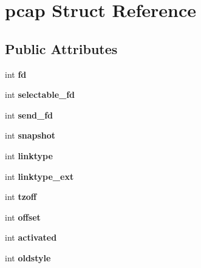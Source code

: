 \hypertarget{structpcap}{
\section{pcap Struct Reference}
\label{structpcap}
}
\subsection*{Public Attributes}
\begin{DoxyCompactItemize}
\item 
\hypertarget{structpcap_af62fe86226b8ac4e32781d40dde1750c}{
int {\bfseries fd}}
\label{structpcap_af62fe86226b8ac4e32781d40dde1750c}

\item 
\hypertarget{structpcap_af1b98dab6bcdf1d6433d32a874aee01a}{
int {\bfseries selectable\_\-fd}}
\label{structpcap_af1b98dab6bcdf1d6433d32a874aee01a}

\item 
\hypertarget{structpcap_aae63fa5b8783665a389a20d225146389}{
int {\bfseries send\_\-fd}}
\label{structpcap_aae63fa5b8783665a389a20d225146389}

\item 
\hypertarget{structpcap_a926f08ed91161e6300a1bf8319204059}{
int {\bfseries snapshot}}
\label{structpcap_a926f08ed91161e6300a1bf8319204059}

\item 
\hypertarget{structpcap_aec70b339b99cd421a34ad4f11091a8eb}{
int {\bfseries linktype}}
\label{structpcap_aec70b339b99cd421a34ad4f11091a8eb}

\item 
\hypertarget{structpcap_a66fb2efa5e37ef0d34040cdedb994ce4}{
int {\bfseries linktype\_\-ext}}
\label{structpcap_a66fb2efa5e37ef0d34040cdedb994ce4}

\item 
\hypertarget{structpcap_aa02a3bc13188acfa19e0637b29937df5}{
int {\bfseries tzoff}}
\label{structpcap_aa02a3bc13188acfa19e0637b29937df5}

\item 
\hypertarget{structpcap_a7f180b0b90a481a4595bf3dea8c02745}{
int {\bfseries offset}}
\label{structpcap_a7f180b0b90a481a4595bf3dea8c02745}

\item 
\hypertarget{structpcap_af3700925c51acd3722a5f6ea3a8154a5}{
int {\bfseries activated}}
\label{structpcap_af3700925c51acd3722a5f6ea3a8154a5}

\item 
\hypertarget{structpcap_afd030d3ab1160663bcc78a8264293b92}{
int {\bfseries oldstyle}}
\label{structpcap_afd030d3ab1160663bcc78a8264293b92}


\end{DoxyCompactItemize}

